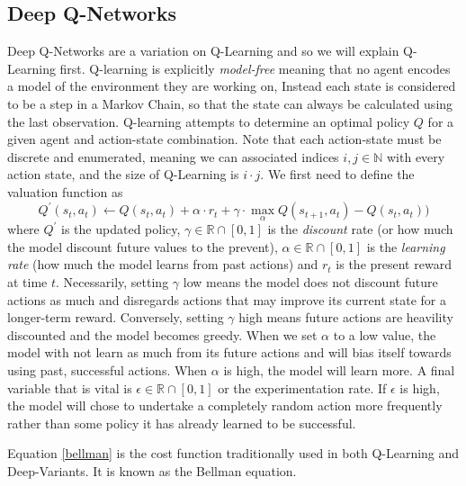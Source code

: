 \documentclass[man, 12pt]{apa6}
\begin{document}
\subsection{Deep Q-Networks}
Deep Q-Networks are a variation on Q-Learning and so we will explain Q-Learning first. Q-learning is explicitly \emph{model-free} meaning that no agent encodes a model of the environment they are working on, Instead each state is considered to be a step in a Markov Chain, so that the state can always be calculated using the last observation. Q-learning attempts to determine an optimal policy $Q$ for a given agent and action-state combination. Note that each action-state must be discrete and enumerated, meaning we can associated indices $i, j \in \mathbb{N}$ with every action state, and the size of Q-Learning is $i \cdot j$. We first need to define the valuation function as 
\begin{equation} 
\label{bellman}
Q^{\prime}(s_{t}, a_{t}) \leftarrow Q(s_{t}, a_{t}) + \alpha \cdot r_{t} + \gamma \cdot \max_{\alpha} Q(s_{t+1}, a_{t}) - Q(s_{t}, a_{t}))  
\end{equation}  where $Q^{\prime}$ is the updated policy, $\gamma \in \mathbb{R} \cap [0,1]$ is the \emph{discount} rate (or how much the model discount future values to the prevent), $\alpha \in \mathbb{R} \cap [0,1]$ is the \emph{learning rate} (how much the model learns from past actions) and $r_{t}$ is the present reward at time $t$.  Necessarily, setting $\gamma$ low means the model does not discount future actions as much and disregards actions that may improve its current state for a longer-term reward. Conversely, setting $\gamma$ high means future actions are heavility discounted and the model becomes greedy. When we set $\alpha$ to a low value, the model with not learn as much from its future actions and will bias itself towards using past, successful actions. When $\alpha$ is high, the model will learn more. A final variable that is vital is $\epsilon \in \mathbb{R} \cap [0,1]$ or the experimentation rate. If $\epsilon$ is high, the model will chose to undertake a completely random action more frequently rather than some policy it has already learned to be successful. 

Equation \ref{bellman} is the cost function traditionally used in both Q-Learning and Deep-Variants. It is known as the Bellman equation. 
\end{document}
